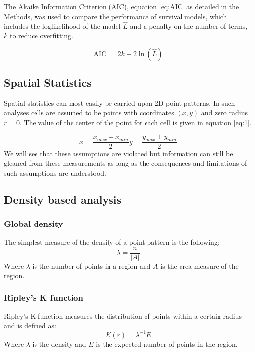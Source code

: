 The Akaike Information Criterion (AIC), equation \ref{eq:AIC} as detailed in the Methods, was used to compare the performance of survival models, which includes the loglikelihood of the model $\hat{L}$ and a penalty on the number of terms, $k$ to reduce overfitting. 

\begin{equation}
\label{eq:AIC}
    {\displaystyle \mathrm {AIC} \,=\,2k-2\ln({\hat {L}})}
\end{equation}

\subsection{Spatial Statistics}

Spatial statistics can most easily be carried upon 2D point patterns. In such analyses cells are assumed to be points with coordinates $(x,y)$ and zero radius $r=0$. The value of the center of the point for each cell is given in equation \ref{eq:1}. 

\begin{equation}    x=\frac{x_{max} + x_{min}}{2}        y = \frac{y_{max} + y_{min}}{2}
\label{eq:1}
\end{equation}
We will see that these assumptions are violated but information can still be gleaned from these measurements as long as the consequences and limitations of such assumptions are understood.

\subsection{Density based analysis}

\subsubsection{Global density}
The simplest measure of the density of a point pattern is the following:
\begin{equation}
    \lambda = \frac{n}{|A|}
\end{equation}
Where $\lambda$ is the number of points in a region and $A$ is the area measure of the region. 

\subsubsection{Ripley's K function}
Ripley's K function measures the distribution of points within a certain radius and is defined as:
\begin{equation}
K(r)=\lambda^{-1}E
\end{equation}
Where $\lambda$ is the density and $E$ is the expected number of points in the region.

